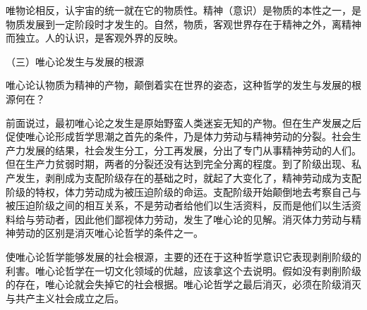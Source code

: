 \documentclass[UTF8, 12pt, a4paper]{ctexrep}
\begin{document}
唯物论相反，认宇宙的统一就在它的物质性。精神（意识）是物质的本性之一，是物质发展到一定阶段时才发生的。自然，物质，客观世界存在于精神之外，离精神而独立。人的认识，是客观外界的反映。

（三）唯心论发生与发展的根源

唯心论认物质为精神的产物，颠倒着实在世界的姿态，这种哲学的发生与发展的根源何在？

前面说过，最初唯心论之发生是原始野蛮人类迷妄无知的产物。但在生产发展之后促使唯心论形成哲学思潮之首先的条件，乃是体力劳动与精神劳动的分裂。社会生产力发展的结果，社会发生分工，分工再发展，分出了专门从事精神劳动的人们。但在生产力贫弱时期，两者的分裂还没有达到完全分离的程度。到了阶级出现、私产发生，剥削成为支配阶级存在的基础之时，就起了大变化了，精神劳动成为支配阶级的特权，体力劳动成为被压迫阶级的命运。支配阶级开始颠倒地去考察自己与被压迫阶级之间的相互关系，不是劳动者给他们以生活资料，反而是他们以生活资料给与劳动者，因此他们鄙视体力劳动，发生了唯心论的见解。消灭体力劳动与精神劳动的区别是消灭唯心论哲学的条件之一。

使唯心论哲学能够发展的社会根源，主要的还在于这种哲学意识它表现剥削阶级的利害。唯心论哲学在一切文化领域的优越，应该拿这个去说明。假如没有剥削阶级的存在，唯心论就会失掉它的社会根据。唯心论哲学之最后消灭，必须在阶级消灭与共产主义社会成立之后。
\end{document}

